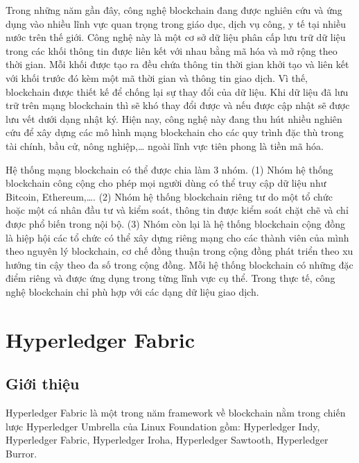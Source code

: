 Trong những năm gần đây, công nghệ blockchain đang được nghiên cứu và ứng dụng vào nhiều lĩnh vực quan trọng trong giáo dục, dịch vụ công, y tế tại nhiều nước trên thế giới. Công nghệ này là một cơ sở dữ liệu phân cấp lưu trữ dữ liệu trong các khối thông tin được liên kết với nhau bằng mã hóa và mở rộng theo thời gian. Mỗi khối được tạo ra đều chứa thông tin thời gian khởi tạo và liên kết với khối trước đó kèm một mã thời gian và thông tin giao dịch. Vì thế, blockchain được thiết kế để chống lại sự thay đổi của dữ liệu. Khi dữ liệu đã lưu trữ trên mạng blockchain thì sẽ khó thay đổi được và nếu được cập nhật sẽ được lưu vết dưới dạng nhật ký. Hiện nay, công nghệ này đang thu hút nhiều nghiên cứu để xây dựng các mô hình mạng blockchain cho các quy trình đặc thù trong tài chính, bầu cử, nông nghiệp,\ldots{} ngoài lĩnh vực tiên phong là tiền mã hóa.

Hệ thống mạng blockchain có thể được chia làm 3 nhóm. (1) Nhóm hệ thống blockchain công cộng cho phép mọi người dùng có thể truy cập dữ liệu như Bitcoin, Ethereum,\ldots{}. (2) Nhóm hệ thống blockchain riêng tư do một tổ chức hoặc một cá nhân đầu tư và kiểm soát, thông tin được kiểm soát chặt chẽ và chỉ được phổ biến trong nội bộ. (3) Nhóm còn lại là hệ thống blockchain cộng đồng là hiệp hội các tổ chức có thể xây dựng riêng mạng cho các thành viên của mình theo nguyên lý blockchain, cơ chế đồng thuận trong cộng đồng phát triển theo xu hướng tin cậy theo đa số trong cộng đồng. Mỗi hệ thống blockchain có những đặc điểm riêng và được ứng dụng trong từng lĩnh vực cụ thể. Trong thực tế, công nghệ blockchain chỉ phù hợp với các dạng dữ liệu giao dịch.

\section{Hyperledger Fabric}

\subsection{Giới thiệu}

Hyperledger Fabric là một trong năm framework về blockchain nằm trong chiến lược Hyperledger Umbrella của Linux Foundation gồm: Hyperledger Indy, Hyperledger Fabric, Hyperledger Iroha, Hyperledger Sawtooth, Hyperledger Burror.

